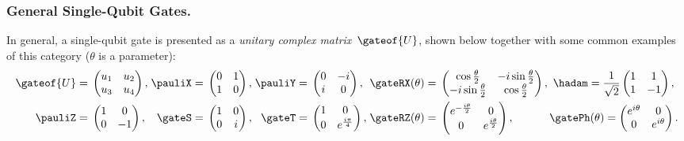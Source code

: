 \subsubsection{General Single-Qubit Gates.} \label{subsubsec:general_single_qubit_gates}
\vspace{-0.0mm}
In general, a single-qubit gate is presented as a \emph{unitary complex
matrix}~$\gateof{U}$, shown below together with some common examples of this
category ($\theta$ is a parameter):
\newcommand{\spc}{\hspace{-2.5mm}}
\newcommand{\spcc}{\hspace{-2.5mm}}
%
\begin{align*}
\gateof{U}={}&
\begin{pmatrix}
 u_1 & u_2 \\
 u_3 & u_4
\end{pmatrix},&\spc
  \pauliX={}&
\begin{pmatrix}
 0 & 1 \\
 1 & 0
\end{pmatrix},&\spc
  \pauliY= {}&
\begin{pmatrix}
0 & -i\\
 i& 0
\end{pmatrix},&\spcc
  \gateRX(\theta)={}&
\begin{pmatrix}
 \cos{\frac{\theta}{2}} & -i\sin{\frac{\theta}{2}} \\
 -i\sin{\frac{\theta}{2}} & \cos{\frac{\theta}{2}}
\end{pmatrix},\ 
  \hadam=\frac 1 {\sqrt 2} 
\begin{pmatrix}
 1 & 1 \\
 1 & -1
\end{pmatrix},\\
  \pauliZ={}&
\begin{pmatrix}
1 & 0\\
 0 & -1
\end{pmatrix},&\spc
  \gateS={}&
\begin{pmatrix}
1 & 0\\
 0 & i
\end{pmatrix},&\spc
  \gateT={}&
\begin{pmatrix}
1 & 0\\
 0 & e^{\frac{i\pi}{4}}
\end{pmatrix},&\spcc
  \gateRZ(\theta) ={}&
\begin{pmatrix}
 e^{-\frac{i\theta}{2}} & 0 \\
 0 & e^{\frac{i\theta}{2}}
\end{pmatrix},\ \hspace{10mm} 
\gatePh(\theta) =
\begin{pmatrix}
 e^{i\theta} & 0 \\
 0 & e^{i\theta}
\end{pmatrix}.
\end{align*}


